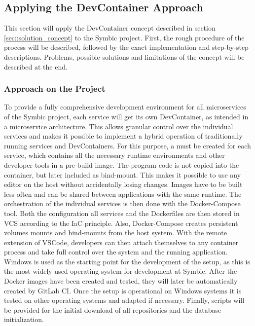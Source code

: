     \subsection{Applying the DevContainer Approach}\label{ssec::apply}
    This section will apply the DevContainer concept described in section \ref{sec::solution_concept} to the Symbic project. First, the rough procedure of the process will be described, followed by the exact implementation and step-by-step descriptions. Problems, possible solutions and limitations of the concept will be described at the end.

        \subsubsection{Approach on the Project}\label{ssec::imp_approach}
        To provide a fully comprehensive development environment for all microservices of the Symbic project, each service will get its own DevContainer, as intended in a microservice architecture. This allows granular control over the individual services and makes it possible to implement a hybrid operation of traditionally running services and DevContainers. For this purpose, a  must be created for each service, which contains all the necessary runtime environments and other developer tools in a pre-build image. The program code is not copied into the container, but later included as bind-mount. This makes it possible to use any editor on the host without accidentally losing changes. Images have to be built less often and can be shared between applications with the same runtime. The orchestration of the individual services is then done with the Docker-Compose tool. Both the configuration all services and the Dockerfiles are then stored in \ac{VCS} according to the \ac{IaC} principle. Also, Docker-Compose creates persistent volumes mounts and bind-mounts from the host system. With the remote extension of \ac{VSCode}, developers can then attach themselves to any container process and take full control over the system and the running application.\newline
        Windows is used as the starting point for the development of the setup, as this is the most widely used operating system for development at Symbic. After the Docker images have been created and tested, they will later be automatically created by GitLab \ac{CI}. Once the setup is operational on Windows systems it is tested on other operating systems and adapted if necessary. Finally, scripts will be provided for the initial download of all repositories and the database initialization.

